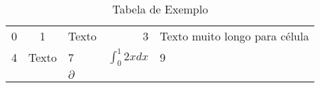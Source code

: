 \begin{table}[h]
	\caption{Tabela de Exemplo}
	\begin{tabular}{l|c|l||r||p{3cm}}
		0 & 1 & Texto & 3 & Texto muito longo para célula\\
		4 & Texto & 7 & $\int_0^1 2x dx$ & 9 \\ \hline
		&  & $\partial$ &  &
	\end{tabular}
	\label{tab:exemplo}
\end{table}